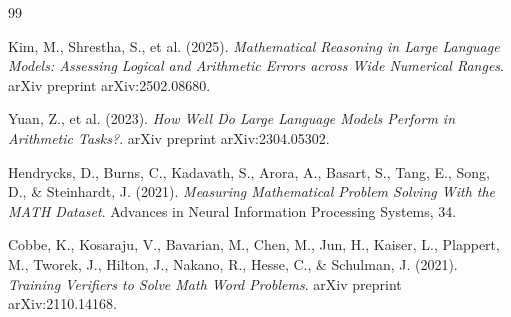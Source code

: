 \documentclass[12pt, a4paper]{article}
\begin{document}
\newpage
\begin{thebibliography}{99}

Kim, M., Shrestha, S., et al. (2025). \textit{Mathematical Reasoning in Large Language Models: Assessing Logical and Arithmetic Errors across Wide Numerical Ranges}. arXiv preprint arXiv:2502.08680.

Yuan, Z., et al. (2023). \textit{How Well Do Large Language Models Perform in Arithmetic Tasks?}. arXiv preprint arXiv:2304.05302.

Hendrycks, D., Burns, C., Kadavath, S., Arora, A., Basart, S., Tang, E., Song, D., \& Steinhardt, J. (2021). \textit{Measuring Mathematical Problem Solving With the MATH Dataset}. Advances in Neural Information Processing Systems, 34.

Cobbe, K., Kosaraju, V., Bavarian, M., Chen, M., Jun, H., Kaiser, L., Plappert, M., Tworek, J., Hilton, J., Nakano, R., Hesse, C., \& Schulman, J. (2021). \textit{Training Verifiers to Solve Math Word Problems}. arXiv preprint arXiv:2110.14168.

\end{thebibliography}
\end{document}
